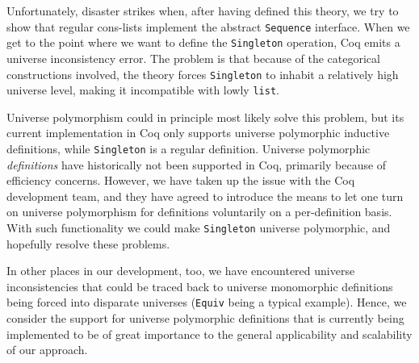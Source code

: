 \documentclass[a4paper,10pt,runningheads]{llncs}
\begin{document}
Unfortunately, disaster strikes when, after having defined this theory, we try to show that regular cons-lists implement the abstract \lstinline|Sequence| interface. When we get to the point where we want to define the \lstinline|Singleton| operation, Coq emits a universe inconsistency error. The problem is that because of the categorical constructions involved, the theory forces \lstinline|Singleton| to inhabit a relatively high universe level, making it incompatible with lowly \lstinline|list|.

Universe polymorphism could in principle most likely solve this problem, but its current implementation in Coq only supports universe polymorphic inductive definitions, while \lstinline|Singleton| is a regular definition. Universe polymorphic \emph{definitions} have historically not been supported in Coq, primarily because of efficiency concerns. However, we have taken up the issue with the Coq development team, and they have agreed to introduce the means to let one turn on universe polymorphism for definitions voluntarily on a per-definition basis. With such functionality we could make \lstinline|Singleton| universe polymorphic, and hopefully resolve these problems.

In other places in our development, too, we have encountered universe inconsistencies that could be traced back to universe monomorphic definitions being forced into disparate universes (\lstinline|Equiv| being a typical example). Hence, we consider the support for universe polymorphic definitions that is currently being implemented to be of great importance to the general applicability and scalability of our approach.


\begin{comment}
Canonical structures have been used to provide a uniform treatment~\cite{bertot2008canonical} of big
operators, like $\Pi,\Sigma, \max$. These operators extend a pair of a binary and a 0-ary operation
to an $n$-ary operation for any $n$. Categorically, one considers the algebra maps from non-empty
lists, lists, inhabited finite sets and finite sets to the carrier of a semigroup, monoid,
commutative semigroup, commutative monoid. Hence we want to reuse the libraries for lists etc.\ as much as possible.

Again, we can use type classes, instead of canonical structures, to deduce the relevant monoid operation:
\begin{lstlisting}
  Definition seq_sum
    `{Sequence A T} `{RingPlus A} `{z: RingZero A}: T $\to$ A
    := @seq_to_monoid A T _ A ring_plus z id.
  Eval compute in seq_sum [3; 2].
\end{lstlisting}
\end{comment}
\end{document}
